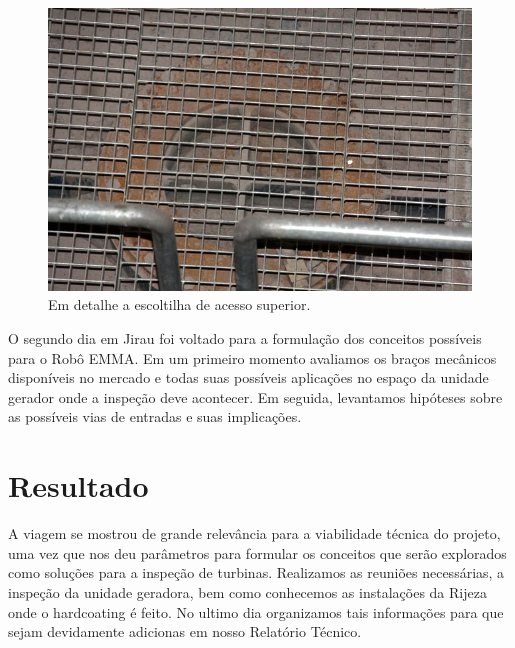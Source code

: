 \documentclass[a4paper,11pt,oneside,openany,brazilian,version=last,draft=false,]{main}
\begin{document}
\begin{twocolumn}
\begin{figure}[H]
\centering
\includegraphics[width=\columnwidth]{Fotos/img_4978.jpg}
\caption{Em detalhe a escoltilha de acesso superior.}
\end{figure}

O segundo dia em Jirau foi voltado para a formulação dos conceitos possíveis
para o Robô EMMA. Em um primeiro momento avaliamos os braços mecânicos
disponíveis no mercado e todas suas possíveis aplicações no espaço da unidade
gerador onde a inspeção deve acontecer. Em seguida, levantamos hipóteses sobre
as possíveis vias de entradas e suas implicações. 

\section{Resultado}
A viagem se mostrou de grande relevância para a viabilidade técnica do projeto,
uma vez que nos deu parâmetros para formular os conceitos que serão explorados
como soluções para a inspeção de turbinas. Realizamos as reuniões
necessárias, a inspeção da unidade geradora, bem como conhecemos as instalações
da Rijeza onde o hardcoating é feito. No ultimo dia organizamos tais informações
para que sejam devidamente adicionas em nosso Relatório Técnico.
\end{twocolumn}
\end{document}
